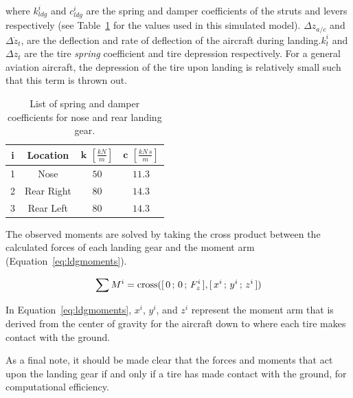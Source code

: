 \documentclass[12pt]{report}
\begin{document}
where \(k^i_{ldg}\) and \(c^i_{ldg}\) are the spring and damper coefficients of the struts and levers respectively (see Table~\ref{tbl:ldgcoeff} for the values used in this simulated model). \(\Delta z_{a/c}\) and \(\Delta \dot{z}_t\), are the deflection and rate of deflection of the aircraft during landing.\( k^i_t \) and \(\Delta z_t\) are the tire \textit{spring} coefficient and tire depression respectively. For a general aviation aircraft, the depression of the tire upon landing is relatively small such that this term is thrown out.

\begin{table}[!ht]\label{tbl:ldgcoeff}
  \caption{List of spring and damper coefficients for nose and rear landing gear.}
  \centering
  \begin{tabular}{cccc}
    \toprule
    \textbf{i} & \textbf{Location} & \(\mathbf{k}\) \(  \left[\frac{kN}{m}\right]\) & \(\mathbf{c}\) \( \left[\frac{kN\,s}{m}\right]\) \\
    \midrule
    1          & Nose              & \(50\)                                         & \(11.3\)                                         \\
    2          & Rear Right        & \(80\)                                         & \(14.3\)                                         \\
    3          & Rear Left         & \(80\)                                         & \(14.3\)                                         \\
    \bottomrule
  \end{tabular}
\end{table}

The observed moments are solved by taking the cross product between the calculated forces of each landing gear and the moment arm (Equation~\ref{eq:ldgmoments}).

\begin{equation}
  \sum M^i = \textnormal{cross}([\,0\,;\,0\,;\,F^i_z\,],[\,x^i\,;\,y^i\,;\,z^i\,])
  \label{eq:ldgmoments}
\end{equation}

In Equation~\ref{eq:ldgmoments}, \(x^i\), \(y^i\), and \(z^i\) represent the moment arm that is derived from the center of gravity for the aircraft down to where each tire makes contact with the ground.

As a final note, it should be made clear that the forces and moments that act upon the landing gear if and only if a tire has made contact with the ground, for computational efficiency.
\end{document}
